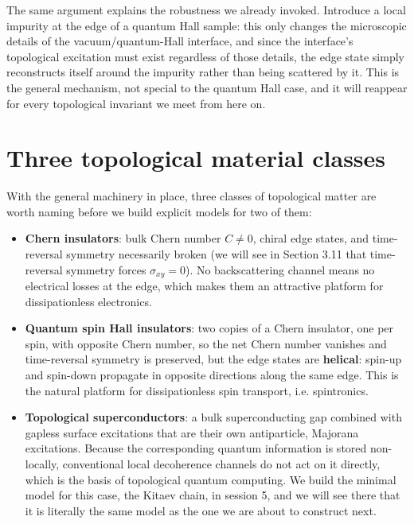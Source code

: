 

The same argument explains the robustness we already invoked. Introduce a local impurity at the edge
of a quantum Hall sample: this only changes the microscopic details of the vacuum/quantum-Hall
interface, and since the interface's topological excitation must exist regardless of those details,
the edge state simply reconstructs itself around the impurity rather than being scattered by it. This
is the general mechanism, not special to the quantum Hall case, and it will reappear for every
topological invariant we meet from here on.

\section{Three topological material classes}

With the general machinery in place, three classes of topological matter are worth naming before we
build explicit models for two of them:

\begin{itemize}
\item \textbf{Chern insulators}: bulk Chern number $C \neq 0$, chiral edge states, and time-reversal symmetry
  necessarily broken (we will see in Section 3.11 that time-reversal symmetry forces $\sigma_{xy}=0$).
  No backscattering channel means no electrical losses at the edge, which makes them an attractive
  platform for dissipationless electronics.
\item \textbf{Quantum spin Hall insulators}: two copies of a Chern insulator, one per spin, with opposite
  Chern number, so the net Chern number vanishes and time-reversal symmetry is preserved, but the
  edge states are \textbf{helical}: spin-up and spin-down propagate in opposite directions along the same
  edge. This is the natural platform for dissipationless spin transport, i.e. spintronics.
\item \textbf{Topological superconductors}: a bulk superconducting gap combined with gapless surface
  excitations that are their own antiparticle, Majorana excitations. Because the corresponding
  quantum information is stored non-locally, conventional local decoherence channels do not act on
  it directly, which is the basis of topological quantum computing. We build the minimal model for
  this case, the Kitaev chain, in session 5, and we will see there that it is literally the same
  model as the one we are about to construct next.
\end{itemize}

